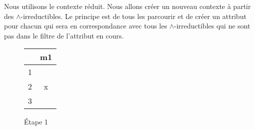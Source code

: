 Nous utilisons le contexte réduit. Nous allons créer un nouveau contexte à partir des $\wedge$-irreductibles. Le principe est de tous les parcourir et de créer un attribut pour chacun qui sera en correspondance avec tous les $\wedge$-irreductibles qui ne sont pas dans le filtre de l'attribut en cours.

\begin{figure}[H]
	\begin{minipage}[c]{0.5\textwidth}
	\begin{center}
		\begin{tabular}{ l | c }
			 & m1\\
			\hline
			1 & \\
			2 & x \\
			3 & \\
		\end{tabular}
	\end{center}
	\end{minipage}
	\begin{minipage}[c]{0.5\textwidth}
	\begin{center}
	\end{center}
	\end{minipage}
	\caption{Étape 1}
\end{figure}

